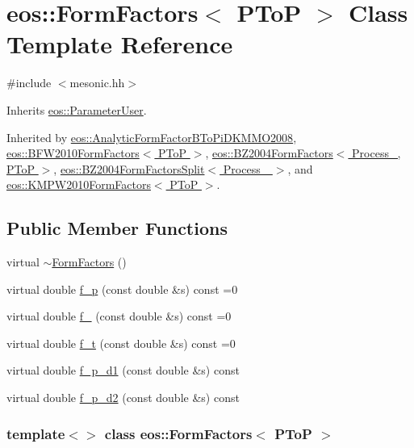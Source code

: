 \hypertarget{classeos_1_1FormFactors_3_01PToP_01_4}{
\section{eos::FormFactors$<$ PToP $>$ Class Template Reference}
\label{classeos_1_1FormFactors_3_01PToP_01_4}
}


{\ttfamily \#include $<$mesonic.hh$>$}

Inherits \hyperlink{classeos_1_1ParameterUser}{eos::ParameterUser}.

Inherited by \hyperlink{classeos_1_1AnalyticFormFactorBToPiDKMMO2008}{eos::AnalyticFormFactorBToPiDKMMO2008}, \hyperlink{classeos_1_1BFW2010FormFactors_3_01PToP_01_4}{eos::BFW2010FormFactors$<$ PToP $>$}, \hyperlink{classeos_1_1BZ2004FormFactors_3_01Process___00_01PToP_01_4}{eos::BZ2004FormFactors$<$ Process\_\-, PToP $>$}, \hyperlink{classeos_1_1BZ2004FormFactorsSplit}{eos::BZ2004FormFactorsSplit$<$ Process\_\- $>$}, and \hyperlink{classeos_1_1KMPW2010FormFactors_3_01PToP_01_4}{eos::KMPW2010FormFactors$<$ PToP $>$}.\subsection*{Public Member Functions}
\begin{DoxyCompactItemize}
\item 
virtual \hyperlink{classeos_1_1FormFactors_3_01PToP_01_4_a2e81880c8a11bbe98466cd077c41b2b2}{$\sim$FormFactors} ()
\item 
virtual double \hyperlink{classeos_1_1FormFactors_3_01PToP_01_4_a987757eb4559de496005ed2730e78a10}{f\_\-p} (const double \&s) const =0
\item 
virtual double \hyperlink{classeos_1_1FormFactors_3_01PToP_01_4_a097a12cde6acb9004d1a92cbb8e60734}{f\_} (const double \&s) const =0
\item 
virtual double \hyperlink{classeos_1_1FormFactors_3_01PToP_01_4_ae753d67d42936bd32b043838e7fb769a}{f\_\-t} (const double \&s) const =0
\item 
virtual double \hyperlink{classeos_1_1FormFactors_3_01PToP_01_4_a16406f05b7715291b392f856fff988e2}{f\_\-p\_\-d1} (const double \&s) const 
\item 
virtual double \hyperlink{classeos_1_1FormFactors_3_01PToP_01_4_a875a81786cd947c56c0cdc1737455707}{f\_\-p\_\-d2} (const double \&s) const 
\end{DoxyCompactItemize}
\subsubsection*{template$<$$>$ class eos::FormFactors$<$ PToP $>$}



